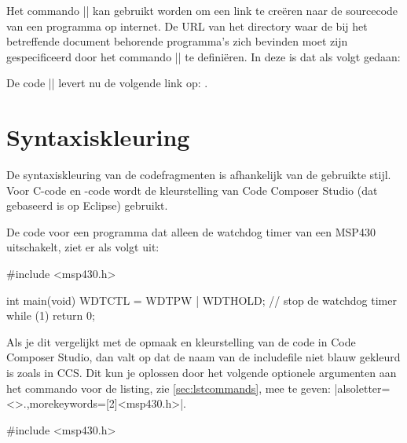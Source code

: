 Het commando |\proglink| kan gebruikt worden om een link te creëren naar de sourcecode van een programma op internet.
De URL van het directory waar de bij het betreffende document behorende programma's zich bevinden moet zijn gespecificeerd door het commando |\progurl| te definiëren.
In deze \MakeLowercase\documenttype{} is dat als volgt gedaan:


De code || levert nu de volgende link op: .

\section{Syntaxiskleuring}
\label{sec:syntaxiskleuring}
De syntaxiskleuring van de codefragmenten is afhankelijk van de gebruikte stijl.
Voor C-code en \Cpp{}-code wordt de kleurstelling van Code Composer Studio (dat gebaseerd is op Eclipse) gebruikt.

De code voor een programma dat alleen de watchdog timer van een MSP430 uitschakelt, ziet er als volgt uit:

\begin{lstfragment}[style=cstyle]
#include <msp430.h>

int main(void)
{
    WDTCTL = WDTPW | WDTHOLD; // stop de watchdog timer
    while (1)
    {
    }
    return 0;
}
\end{lstfragment}

Als je dit vergelijkt met de opmaak en kleurstelling van de code in Code Composer Studio, dan valt op dat de naam van de includefile  niet blauw gekleurd is zoals in CCS.
Dit kun je oplossen door het volgende optionele argumenten aan het commando voor de listing, zie \cref{sec:lstcommands}, mee te geven: |alsoletter={<>.},morekeywords={[2]{<msp430.h>}}|.

\begin{lstfragment}[style=cstyle,alsoletter={<>.},morekeywords={[2]{<msp430.h>}}]
#include <msp430.h>
\end{lstfragment}    